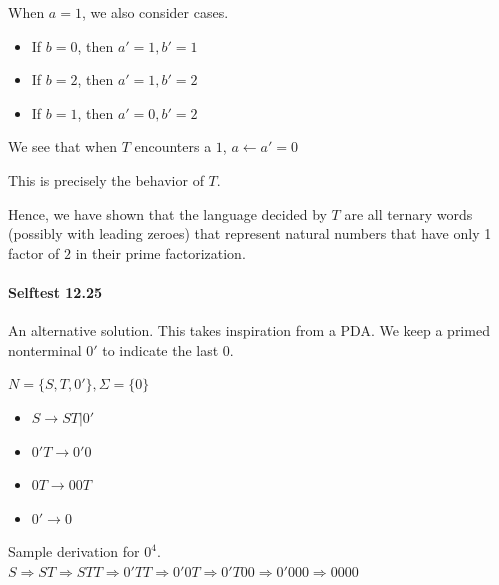\documentclass{article}
\begin{document}
When $a=1$, we also consider cases.
\begin{itemize}
	\item If $b=0$, then $a'=1, b'=1$
	\item If $b=2$, then $a'=1, b'=2$
	\item If $b=1$, then $a'=0, b'=2$
\end{itemize}
We see that when $T$ encounters a $1$, $a\gets a'=0$

This is precisely the behavior of $T$.

Hence, we have shown that the language decided by $T$ are all ternary words (possibly with leading zeroes) that represent natural numbers that have only 1 factor of $2$ in their prime factorization.

\paragraph{Selftest 12.25} An alternative solution. This takes inspiration from a PDA. We keep a primed nonterminal $0'$ to indicate the last 0.

$N=\{S,T,0'\}, \Sigma=\{0\}$
\begin{itemize}
	\item $S\rightarrow ST | 0'$
	\item $0'T\rightarrow 0'0$
	\item $0T\rightarrow 00T$
	\item $0'\rightarrow 0$
\end{itemize}
Sample derivation for $0^4$.\\
$S\Rightarrow ST\Rightarrow STT\Rightarrow 0'TT\Rightarrow 0'0T\Rightarrow 0'T00\Rightarrow 0'000\Rightarrow 0000$
\end{document}
